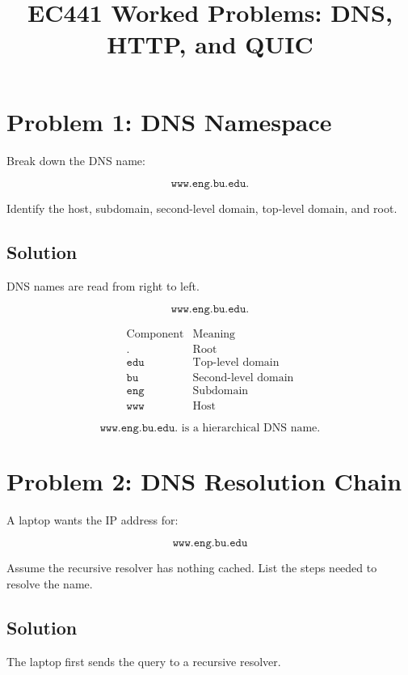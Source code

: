 \documentclass[12pt]{article}
\title{EC441 Worked Problems: DNS, HTTP, and QUIC}
\author{}
\date{}
\begin{document}
\maketitle

\section*{Problem 1: DNS Namespace}

Break down the DNS name:

\[
\texttt{www.eng.bu.edu.}
\]

Identify the host, subdomain, second-level domain, top-level domain, and root.

\subsection*{Solution}

DNS names are read from right to left.

\[
\texttt{www.eng.bu.edu.}
\]

\[
\begin{array}{c|c}
\text{Component} & \text{Meaning} \\
\hline
\texttt{.} & \text{Root} \\
\texttt{edu} & \text{Top-level domain} \\
\texttt{bu} & \text{Second-level domain} \\
\texttt{eng} & \text{Subdomain} \\
\texttt{www} & \text{Host}
\end{array}
\]

\[
\boxed{\texttt{www.eng.bu.edu.} \text{ is a hierarchical DNS name.}}
\]

\section*{Problem 2: DNS Resolution Chain}

A laptop wants the IP address for:

\[
\texttt{www.eng.bu.edu}
\]

Assume the recursive resolver has nothing cached. List the steps needed to resolve the name.

\subsection*{Solution}

The laptop first sends the query to a recursive resolver.
\end{document}
